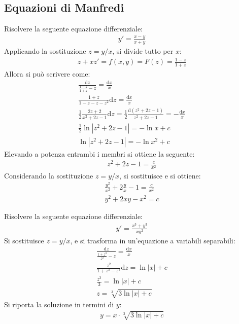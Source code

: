 \documentclass{article}
\newcommand{\df}{\mathrm{d}}
\numberwithin{equation}{subsection}
\begin{document}
\subsection{Equazioni di Manfredi}


Risolvere la seguente equazione differenziale:
\begin{gather*}
    y'=\displaystyle\frac{x-y}{x+y}
\end{gather*}
Applicando la sostituzione $z=y/x$, si divide tutto per $x$:
\begin{gather*}
    z+xz'=f(x,y)=F(z)=\displaystyle\frac{1-z}{1+z}
\end{gather*}
Allora si può scrivere come:
\begin{gather*}
    \displaystyle\frac{\df z}{\frac{1-z}{1+z}-z}=\frac{\df x}{x}\\
    \displaystyle\frac{1+z}{1-z-z-z^2}\df z=\frac{\df x}{x}\\
    \displaystyle\frac{1}{2}\frac{2z+2}{x^2+2z-1}\df z=\frac{1}{2}\frac{\df(z^2+2z-1)}{z^2+2z-1}=-\frac{\df x}{x}\\
    \displaystyle\frac{1}{2}\ln|z^2+2z-1|=-\ln x+c\\
    \displaystyle\ln|z^2+2z-1|=-\ln x^2+c
\end{gather*}
Elevando a potenza entrambi i membri si ottiene la seguente:
\begin{gather*}
    z^2+2z-1=\frac{c}{x^2}
\end{gather*}
Considerando la sostituzione $z=y/x$, si sostituisce e si ottiene:
\begin{gather*}
    \displaystyle\frac{y^2}{x^2}+2\frac{y}{x}-1=\frac{c}{x^2}\\
    y^2+2xy-x^2=c
\end{gather*}



Risolvere la seguente equazione differenziale:
\begin{gather*}
    y'=\displaystyle\frac{x^3+y^3}{xy^2}
\end{gather*}
Si sostituisce $z=y/x$, e si trasforma in un'equazione a variabili separabili:
\begin{gather*}
    \frac{\df z}{\frac{1+z^3}{z^2}-z}=\frac{\df x}{x}\\
    \frac{z^2}{1+z^3-z^3}\df z=\ln|x|+c\\
    \frac{z^3}{3}=\ln|x|+c\\
    z=\sqrt[3]{3\ln|x|+c}
\end{gather*}
Si riporta la soluzione in termini di $y$:
\begin{gather*}
    y=x\cdot\sqrt[3]{3\ln|x|+c}
\end{gather*}
\end{document}
